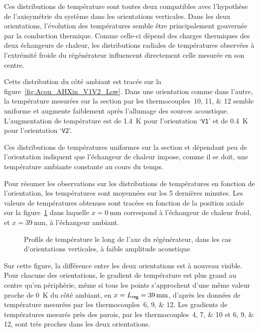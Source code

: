 Ces distributions de température sont toutes deux compatibles avec l'hypothèse de l'axisymétrie du système dans les orientations verticales. Dans les deux orientations, l'évolution des températures semble être principalement gouvernée par la conduction thermique. Comme celle-ci dépend des charges thermiques des deux échangeurs de chaleur, les distributions radiales de températures observées à l'extrémité froide du régénérateur influencent directement celle mesurée en son centre.\medskip

Cette distribution du côté ambiant est tracée sur la figure~\ref{fig:Acou_AHXin_V1V2_Low}. Dans une orientation comme dans l'autre, la température mesurées sur la section par les thermocouples~\numlist{10;11;12} semble uniforme et augmente faiblement après l'allumage des sources acoustique. L'augmentation de température est de \qty{1.4}{\kelvin} pour l'orientation `\texttt{V1}' et de \qty{.4}{\kelvin} pour l'orientation `\texttt{V2}'.\smallskip

Ces distributions de températures uniformes sur la section et dépendant peu de l'orientation indiquent que l'échangeur de chaleur impose, comme il se doit, une température ambiante constante au cours du temps.\bigskip

Pour résumer les observations sur les distributions de températures en fonction de l'orientation, les températures sont moyennées sur les \num{5} dernières minutes. Les valeurs de températures obtenues sont tracées en fonction de la position axiale sur la figure~\ref{fig:Acou_axProfile_V1V2_Low} dans laquelle $x=\qty{0}{\milli\meter}$ correspond à l'échangeur de chaleur froid, et $x=\qty{39}{\milli\meter}$, à l'échangeur ambiant.

\begin{figure}[!ht]
	\centering
	
	\caption{Profils de température le long de l'axe du régénérateur, dans les cas d'orientations verticales, à faible amplitude acoustique}
	\label{fig:Acou_axProfile_V1V2_Low}
\end{figure}

Sur cette figure, la différence entre les deux orientations est à nouveau visible. Pour chacune des orientations, le gradient de température est plus grand au centre qu'en périphérie, même si tous les points s'approchent d'une même valeur proche de \qty{0}{\kelvin} du côté ambiant, en $x=L_{\sf reg}=\qty{39}{\milli\meter}$, d'après les données de température mesurées par les thermocouples~\numlist{6;9;12}. Les gradients de températures mesurés près des parois, par les thermocouples~\numlist{4;7;10} et \numlist{6;9;12}, sont très proches dans les deux orientations.

